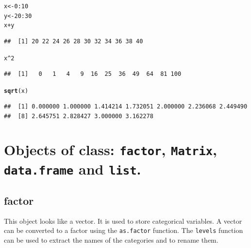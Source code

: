 \documentclass[10pt]{article}\usepackage[]{graphicx}\usepackage[]{color}
\makeatletter
\newcommand{\hlnum}[1]{\textcolor[rgb]{0.686,0.059,0.569}{#1}}%
\newcommand{\hlopt}[1]{\textcolor[rgb]{0,0,0}{#1}}%
\newcommand{\hlstd}[1]{\textcolor[rgb]{0.345,0.345,0.345}{#1}}%
\newcommand{\hlkwb}[1]{\textcolor[rgb]{0.69,0.353,0.396}{#1}}%
\newcommand{\hlkwd}[1]{\textcolor[rgb]{0.737,0.353,0.396}{\textbf{#1}}}%
\newenvironment{kframe}{%
 \def\at@end@of@kframe{}%
 \ifinner\ifhmode%
  \def\at@end@of@kframe{\end{minipage}}%
  \begin{minipage}{\columnwidth}%
 \fi\fi%
 \def\FrameCommand##1{\hskip\@totalleftmargin \hskip-\fboxsep
 \colorbox{shadecolor}{##1}\hskip-\fboxsep
     \hskip-\linewidth \hskip-\@totalleftmargin \hskip\columnwidth}%
 \MakeFramed {\advance\hsize-\width
   \@totalleftmargin\z@ \linewidth\hsize
   \@setminipage}}%
 {\par\unskip\endMakeFramed%
 \at@end@of@kframe}
\newenvironment{knitrout}{}{} %
\newcommand{\Rfunction}[1]{{\texttt{#1}}}
\makeatother
\begin{document}
\begin{knitrout}
\color{fgcolor}\begin{kframe}
\begin{alltt}
\hlstd{x} \hlkwb{<-} \hlnum{0}\hlopt{:}\hlnum{10}
\hlstd{y} \hlkwb{<-} \hlnum{20}\hlopt{:}\hlnum{30}
\hlstd{x}\hlopt{+}\hlstd{y}
\end{alltt}
\begin{verbatim}
##  [1] 20 22 24 26 28 30 32 34 36 38 40
\end{verbatim}
\begin{alltt}
\hlstd{x}\hlopt{^}\hlnum{2}
\end{alltt}
\begin{verbatim}
##  [1]   0   1   4   9  16  25  36  49  64  81 100
\end{verbatim}
\begin{alltt}
\hlkwd{sqrt}\hlstd{(x)}
\end{alltt}
\begin{verbatim}
##  [1] 0.000000 1.000000 1.414214 1.732051 2.000000 2.236068 2.449490
##  [8] 2.645751 2.828427 3.000000 3.162278
\end{verbatim}
\end{kframe}
\end{knitrout}
\medskip


\section{Objects of class: \Rfunction{factor}, \Rfunction{Matrix}, \Rfunction{data.frame} and \Rfunction{list}.}

\subsection{factor}
This object looks like a vector. It is used to store categorical variables. A vector can be converted to a factor using the \Rfunction{as.factor} function. The \Rfunction{levels} function can be used to extract the names of the categories and to rename them.
\end{document}
